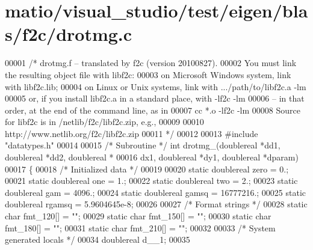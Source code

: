 \hypertarget{matio_2visual__studio_2test_2eigen_2blas_2f2c_2drotmg_8c_source}{}\section{matio/visual\+\_\+studio/test/eigen/blas/f2c/drotmg.c}
\label{matio_2visual__studio_2test_2eigen_2blas_2f2c_2drotmg_8c_source}

\begin{DoxyCode}
00001 \textcolor{comment}{/* drotmg.f -- translated by f2c (version 20100827).}
00002 \textcolor{comment}{   You must link the resulting object file with libf2c:}
00003 \textcolor{comment}{    on Microsoft Windows system, link with libf2c.lib;}
00004 \textcolor{comment}{    on Linux or Unix systems, link with .../path/to/libf2c.a -lm}
00005 \textcolor{comment}{    or, if you install libf2c.a in a standard place, with -lf2c -lm}
00006 \textcolor{comment}{    -- in that order, at the end of the command line, as in}
00007 \textcolor{comment}{        cc *.o -lf2c -lm}
00008 \textcolor{comment}{    Source for libf2c is in /netlib/f2c/libf2c.zip, e.g.,}
00009 \textcolor{comment}{}
00010 \textcolor{comment}{        http://www.netlib.org/f2c/libf2c.zip}
00011 \textcolor{comment}{*/}
00012 
00013 \textcolor{preprocessor}{#include "datatypes.h"}
00014 
00015 \textcolor{comment}{/* Subroutine */} \textcolor{keywordtype}{int} drotmg\_(doublereal *dd1, doublereal *dd2, doublereal *
00016     dx1, doublereal *dy1, doublereal *dparam)
00017 \{
00018     \textcolor{comment}{/* Initialized data */}
00019 
00020     \textcolor{keyword}{static} doublereal zero = 0.;
00021     \textcolor{keyword}{static} doublereal one = 1.;
00022     \textcolor{keyword}{static} doublereal two = 2.;
00023     \textcolor{keyword}{static} doublereal gam = 4096.;
00024     \textcolor{keyword}{static} doublereal gamsq = 16777216.;
00025     \textcolor{keyword}{static} doublereal rgamsq = 5.9604645e-8;
00026 
00027     \textcolor{comment}{/* Format strings */}
00028     \textcolor{keyword}{static} \textcolor{keywordtype}{char} fmt\_120[] = \textcolor{stringliteral}{""};
00029     \textcolor{keyword}{static} \textcolor{keywordtype}{char} fmt\_150[] = \textcolor{stringliteral}{""};
00030     \textcolor{keyword}{static} \textcolor{keywordtype}{char} fmt\_180[] = \textcolor{stringliteral}{""};
00031     \textcolor{keyword}{static} \textcolor{keywordtype}{char} fmt\_210[] = \textcolor{stringliteral}{""};
00032 
00033     \textcolor{comment}{/* System generated locals */}
00034     doublereal d\_\_1;
00035 

\end{DoxyCode}
